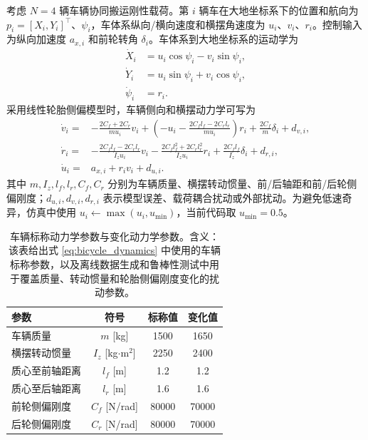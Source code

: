\documentclass[twocolumn,3p,times,procedia]{elsarticle}
\begin{document}
考虑 $N=4$ 辆车辆协同搬运刚性载荷。第 $i$ 辆车在大地坐标系下的位置和航向为
$p_i=[X_i,Y_i]^\top$、$\psi_i$，车体系纵向/横向速度和横摆角速度为 $u_i$、$v_i$、$r_i$。控制输入为纵向加速度 $a_{x,i}$ 和前轮转角 $\delta_i$。车体系到大地坐标系的运动学为
\begin{equation}
\begin{aligned}
\dot X_i &= u_i\cos\psi_i-v_i\sin\psi_i,\\
\dot Y_i &= u_i\sin\psi_i+v_i\cos\psi_i,\\
\dot \psi_i &= r_i .
\end{aligned}
\label{eq:world_kinematics}
\end{equation}
采用线性轮胎侧偏模型时，车辆侧向和横摆动力学可写为
\begin{equation}
\begin{aligned}
\dot v_i=&-\frac{2C_f+2C_r}{m u_i}v_i+
\left(-u_i-\frac{2C_f l_f-2C_r l_r}{m u_i}\right)r_i
+\frac{2C_f}{m}\delta_i+d_{v,i},\\
\dot r_i=&-\frac{2C_f l_f-2C_r l_r}{I_z u_i}v_i
-\frac{2C_f l_f^2+2C_r l_r^2}{I_z u_i}r_i
+\frac{2C_f l_f}{I_z}\delta_i+d_{r,i},\\
\dot u_i=&a_{x,i}+r_i v_i+d_{u,i}.
\end{aligned}
\label{eq:bicycle_dynamics}
\end{equation}
其中 $m,I_z,l_f,l_r,C_f,C_r$ 分别为车辆质量、横摆转动惯量、前/后轴距和前/后轮侧偏刚度；$d_{u,i},d_{v,i},d_{r,i}$ 表示模型误差、载荷耦合扰动或外部扰动。为避免低速奇异，仿真中使用 $u_i\leftarrow\max(u_i,u_{\min})$，当前代码取 $u_{\min}=0.5$。

\begin{table}[!tbp]
\centering
\caption{车辆标称动力学参数与变化动力学参数。含义：该表给出式 \eqref{eq:bicycle_dynamics} 中使用的车辆标称参数，以及离线数据生成和鲁棒性测试中用于覆盖质量、转动惯量和轮胎侧偏刚度变化的扰动参数。}
\label{tab:vehicle_dynamic_params}
\footnotesize
\begin{tabular}{lccc}
\toprule
参数 & 符号 & 标称值 & 变化值 \\
\midrule
车辆质量 & $m$ [kg] & 1500 & 1650\\
横摆转动惯量 & $I_z$ [kg$\cdot$m$^2$] & 2250 & 2400\\
质心至前轴距离 & $l_f$ [m] & 1.2 & 1.2\\
质心至后轴距离 & $l_r$ [m] & 1.6 & 1.6\\
前轮侧偏刚度 & $C_f$ [N/rad] & 80000 & 70000\\
后轮侧偏刚度 & $C_r$ [N/rad] & 80000 & 70000\\
\bottomrule
\end{tabular}
\end{table}
\end{document}
